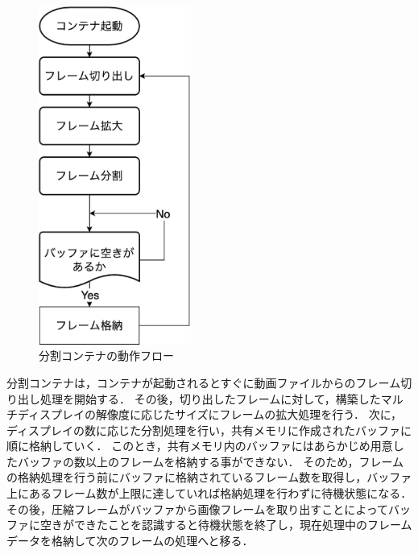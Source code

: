 \begin{figure}[H]
    \hspace*{\fill}
    \includegraphics[width=50mm]{./fig/chap3/bunkatu_flow.eps}
    \hspace*{\fill}
    \caption{分割コンテナの動作フロー}
    \label{divide_container}
\end{figure}

分割コンテナは，コンテナが起動されるとすぐに動画ファイルからのフレーム切り出し処理を開始する．
その後，切り出したフレームに対して，構築したマルチディスプレイの解像度に応じたサイズにフレームの拡大処理を行う．
次に，ディスプレイの数に応じた分割処理を行い，共有メモリに作成されたバッファに順に格納していく．
このとき，共有メモリ内のバッファにはあらかじめ用意したバッファの数以上のフレームを格納する事ができない．
そのため，フレームの格納処理を行う前にバッファに格納されているフレーム数を取得し，バッファ上にあるフレーム数が上限に達していれば格納処理を行わずに待機状態になる．
その後，圧縮フレームがバッファから画像フレームを取り出すことによってバッファに空きができたことを認識すると待機状態を終了し，現在処理中のフレームデータを格納して次のフレームの処理へと移る．

